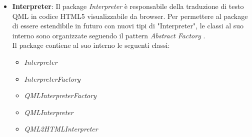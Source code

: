 \begin{itemize}
	\item \textbf{Interpreter}:
	Il package \emph{Interpreter} è responsabile della traduzione di testo QML in codice HTML5 visualizzabile da browser. Per permettere al package di essere estendibile in futuro con nuovi tipi di "Interpreter", le classi al suo interno sono organizzate seguendo il pattern \emph{Abstract Factory} . \\
	Il package contiene al suo interno le seguenti classi:
	\begin{itemize}
	\item \textit{Interpreter}
	\item \textit{InterpreterFactory}
	\item \textit{QMLInterpreterFactory}
	\item \textit{QMLInterpreter}
	\item \textit{QML2HTMLInterpreter}
	\end{itemize}
	
	\end{itemize}
